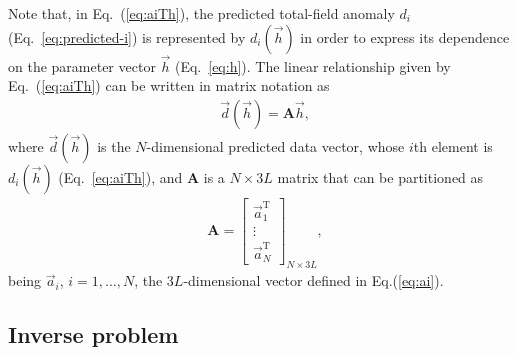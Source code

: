 \documentclass[journal abbreviation, npg]{copernicus}
\providecommand{\DIFadd}[1]{{\protect\color{blue}\uwave{#1}}} %
\providecommand{\DIFaddbegin}{} %
\providecommand{\DIFaddend}{} %
\begin{document}
Note that, in Eq.~(\ref{eq:aiTh}), the predicted total-field anomaly $d_{i}$
(Eq.~\ref{eq:predicted-i}) is represented by $d_{i}(\vec{h})$ in order to
express its dependence on the parameter vector $\vec{h}$ (Eq.~\ref{eq:h}).
The linear relationship given by Eq.~(\ref{eq:aiTh}) can be written in matrix
notation as
\begin{align}
 &
\vec{d}(\vec{h}) = \mathbf{A}  \vec{h} ,
\label{eq:predicted-data-vector}
\end{align}
where $\vec{d}(\vec{h})$ is the $N$-dimensional predicted data vector, whose
$i$th element is $d_{i}(\vec{h})$ (Eq.~\ref{eq:aiTh}), and $\mathbf{A}$ is
a $N \times 3L$ matrix \DIFaddbegin \DIFadd{$\left(N > 3L\right)$ }\DIFaddend that can be partitioned as
\begin{align}
 &
\mathbf{A} =
\left[
\begin{array}{c}
\vec{a}_{1}^{\mathrm{T}} \\
\vdots \\
\vec{a}_{N}^{\mathrm{T}}
\end{array}
\right]_{N \times 3L} ,
\label{eq:sensibility-matrix}
\end{align}
being $\vec{a}_{i}$, $i = 1, \ldots, N$, the $3L$-dimensional vector
defined in Eq.\DIFaddbegin \DIFadd{~}\DIFaddend (\ref{eq:ai}).

\subsection{Inverse problem}
\end{document}
